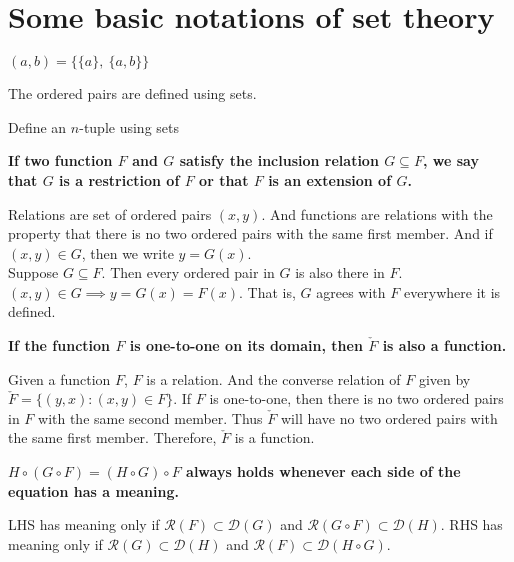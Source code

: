 \documentclass[a4paper,12pt,openany]{book}
\begin{document}
\chapter{Some basic notations of set theory}
\textbf{\phantom{}}
\textbf{$(a,b) = \{ \{a\},\ \{a,b\}\}$}\\
\begin{story}
	The ordered pairs are defined using sets.
\end{story}

\begin{doubt}
	Define an $n$-tuple using sets
\end{doubt}

\textbf{\phantom{}}
\textbf{If two function $F$ and $G$ satisfy the inclusion relation $G \subseteq F$, we say that $G$ is a restriction of $F$ or that $F$ is an extension of $G$.}\\
\begin{story}
	Relations are set of ordered pairs $(x,y)$.
	And functions are relations with the property that there is no two ordered pairs with the same first member.
	And if $(x,y) \in G$, then we write $y = G(x)$.\\

	Suppose $G \subseteq F$.
	Then every ordered pair in $G$ is also there in $F$.
	$(x,y) \in G \implies y = G(x) = F(x)$.
	That is, $G$ agrees with $F$ everywhere it is defined.
\end{story}

\textbf{\phantom{}}
\textbf{If the function $F$ is one-to-one on its domain, then $\check{F}$ is also a function.}\\
\begin{story}
	Given a function $F$, $F$ is a relation.
	And the converse relation of $F$ given by $\check{F} = \{ (y,x) : (x,y) \in F \}$.
	If $F$ is one-to-one, then there is no two ordered pairs in $F$ with the same second member.
	Thus $\check{F}$ will have no two ordered pairs with the same first member.
	Therefore, $\check{F}$ is a function.
\end{story}

\textbf{\phantom{}}
\textbf{$H\circ(G \circ F) = (H \circ G) \circ F$ always holds whenever each side of the equation has a meaning.}\\
\begin{story}
	LHS has meaning only if $\mathscr{R}(F) \subset \mathscr{D}(G)$ and $\mathscr{R}(G \circ F) \subset \mathscr{D}(H)$.
	RHS has meaning only if $\mathscr{R}(G) \subset \mathscr{D}(H)$ and $\mathscr{R}(F) \subset \mathscr{D}(H \circ G)$.
\end{story}
\end{document}
